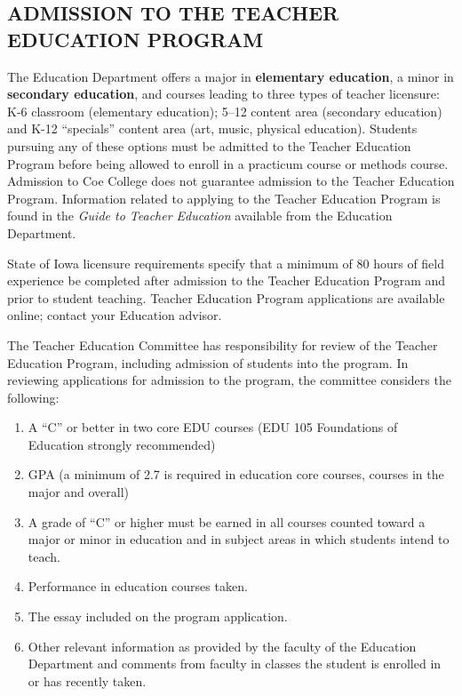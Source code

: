 \documentclass[
  letterpaper,
]{scrbook}
\providecommand{\tightlist}{%
  \setlength{\itemsep}{0pt}\setlength{\parskip}{0pt}}
\begin{document}
\subsection{ADMISSION TO THE TEACHER EDUCATION
PROGRAM}\label{admission-to-the-teacher-education-program}

The Education Department offers a major in \textbf{elementary
education}, a minor in \textbf{secondary education}, and courses leading
to three types of teacher licensure: K-6 classroom (elementary
education); 5--12 content area (secondary education) and K-12
``specials'' content area (art, music, physical education). Students
pursuing any of these options must be admitted to the Teacher Education
Program before being allowed to enroll in a practicum course or methods
course. Admission to Coe College does not guarantee admission to the
Teacher Education Program. Information related to applying to the
Teacher Education Program is found in the \emph{Guide to Teacher
Education} available from the Education Department.

State of Iowa licensure requirements specify that a minimum of 80 hours
of field experience be completed after admission to the Teacher
Education Program and prior to student teaching. Teacher Education
Program applications are available online; contact your Education
advisor.

The Teacher Education Committee has responsibility for review of the
Teacher Education Program, including admission of students into the
program. In reviewing applications for admission to the program, the
committee considers the following:

\begin{enumerate}
\def\labelenumi{\arabic{enumi}.}
\tightlist
\item
  A ``C'' or better in two core EDU courses (EDU 105 Foundations of
  Education strongly recommended)
\item
  GPA (a minimum of 2.7 is required in education core courses, courses
  in the major and overall)
\item
  A grade of ``C'' or higher must be earned in all courses counted
  toward a major or minor in education and in subject areas in which
  students intend to teach.
\item
  Performance in education courses taken.
\item
  The essay included on the program application.
\item
  Other relevant information as provided by the faculty of the Education
  Department and comments from faculty in classes the student is
  enrolled in or has recently taken.
\end{enumerate}
\end{document}
